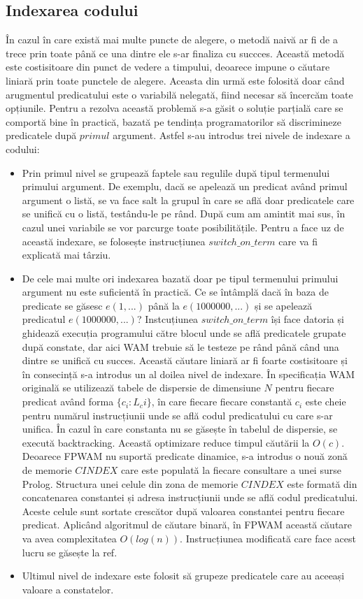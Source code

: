\documentclass[12pt,a4paper,twoside]{report}
\begin{document}
\subsection{Indexarea codului}
În cazul în care există mai multe puncte de alegere, o metodă naivă ar fi de a trece prin toate până ce una dintre ele s-ar finaliza cu succces. Această metodă este costisitoare din punct de vedere a timpului, deoarece impune o căutare liniară prin toate punctele de alegere. Aceasta din urmă este folosită doar când arugmentul predicatului este o variabilă nelegată, fiind necesar să încercăm toate opțiunile. Pentru a rezolva această problemă s-a găsit o soluție parțială care se comportă bine în practică, bazată pe tendința programatorilor să discrimineze predicatele după $primul$ argument. Astfel s-au introdus trei nivele de indexare a codului:
\begin{itemize}
\item Prin primul nivel se grupează faptele sau regulile după tipul termenului primului argument. De exemplu, dacă se apelează un predicat având primul argument o listă, se va face salt la grupul în care se află doar predicatele care se unifică cu o listă, testându-le pe rând. După cum am amintit mai sus, în cazul unei variabile se vor parcurge toate posibilitățile. Pentru a face uz de această indexare, se folosește instrucțiunea $switch\_on\_term$ care va fi explicată mai târziu.
\item De cele mai multe ori indexarea bazată doar pe tipul termenului primului argument nu este suficientă în practică. Ce se întâmplă dacă în baza de predicate se găsesc $e(1, ...)$ până la $e(1000000, ...)$ și se apelează predicatul $e(1000000, ...)$?  Instcuțiunea $switch\_on\_term$ își face datoria și ghidează execuția programului către blocul unde se află predicatele grupate după constate, dar aici WAM trebuie să le testeze pe rând până când una dintre se unifică cu succes. Această căutare liniară ar fi foarte costisitoare și în consecință s-a introdus un al doilea nivel de indexare. În specificația WAM originală se utilizează tabele de dispersie de dimensiune $N$ pentru fiecare predicat având forma $\{c_i : L_ci\}$, în care fiecare fiecare constantă $c_i$ este cheie pentru numărul instrucțiunii unde se află codul predicatului cu care s-ar unifica. În cazul în care constanta nu se găsește în tabelul de dispersie, se execută backtracking. Această optimizare reduce timpul căutării la $O(c)$. Deoarece FPWAM nu suportă predicate dinamice, s-a introdus o nouă zonă de memorie $CINDEX$ care este populată la fiecare consultare a unei surse Prolog. Structura unei celule din zona de memorie $CINDEX$ este formată din concatenarea constantei și adresa instrucțiunii unde se află codul predicatului. Aceste celule sunt sortate crescător după valoarea constantei pentru fiecare predicat. Aplicând algoritmul de căutare binară, în FPWAM această căutare va avea complexitatea $O(log(n)).$ Instrucțiunea modificată care face acest lucru se găsește la ref.
\item Ultimul nivel de indexare este folosit să grupeze predicatele care au aceeași valoare a constatelor.\end{itemize}
\end{document}
